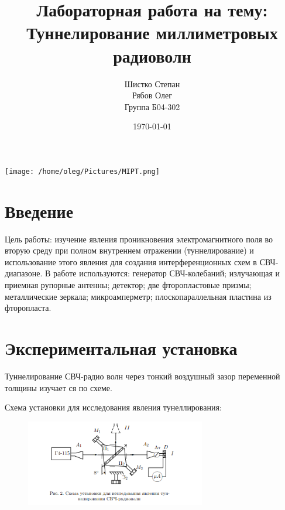 \documentclass[a4paper, 12pt]{article}
\begin{document}
\begin{titlepage}
    \title{Лабораторная работа на тему: \\ 
    Туннелирование миллиметровых радиоволн   
    }
    \author{Шистко Степан\\
    Рябов Олег\\
    Группа Б04-302}
    \date{\today}
    \maketitle
    \vfill
    \begin{center}
        \texttt{[image: /home/oleg/Pictures/MIPT.png]}
    \end{center}
\end{titlepage}

\setcounter{page}{2}
\newpage
\section{Введение}
Цель работы: изучение явления проникновения электромагнитного поля во вторую среду при полном внутреннем отражении
(туннелирование) и использование этого явления для создания
интерференционных схем в СВЧ-диапазоне.
В работе используются: генератор СВЧ-колебаний; излучающая и приемная рупорные 
антенны; детектор; две фторопластовые призмы; металлические зеркала; микроамперметр;
 плоскопараллельная пластина из фторопласта.

\section{Экспериментальная установка}
Туннелирование СВЧ-радио
волн через тонкий воздушный зазор переменной толщины изучает
ся по схеме.

Схема установки для исследования явления тунеллирования:

\begin{figure}[h!]
    \includegraphics[width=0.7\textwidth]{pictures/scheme1.png}
\end{figure}
\end{document}

